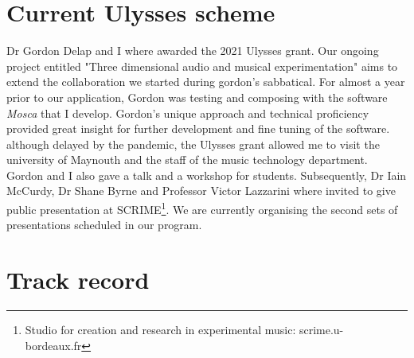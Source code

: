 \documentclass[journal,onecolumn]{IEEEtran}
\begin{document}
\section{Current Ulysses scheme} %
Dr Gordon Delap and I where awarded the 2021 Ulysses grant. Our ongoing project entitled "Three dimensional audio and musical experimentation" aims to extend the collaboration we started during gordon's sabbatical. For almost a year prior to our application, Gordon was testing and composing with the software \textit{Mosca} \cite{mott:mosca} that I develop. Gordon's unique approach and technical proficiency provided great insight for further development and fine tuning of the software. although delayed by the pandemic, the Ulysses grant allowed me to visit the university of Maynouth and the staff of the music technology department. Gordon and I also gave a talk and a workshop for students. Subsequently, Dr Iain McCurdy, Dr Shane Byrne and Professor Victor Lazzarini where invited to give public presentation at SCRIME\footnote{Studio for creation and research in experimental music: scrime.u-bordeaux.fr}. We are currently organising the second sets of presentations scheduled in our program.

\section{Track record}
\end{document}
